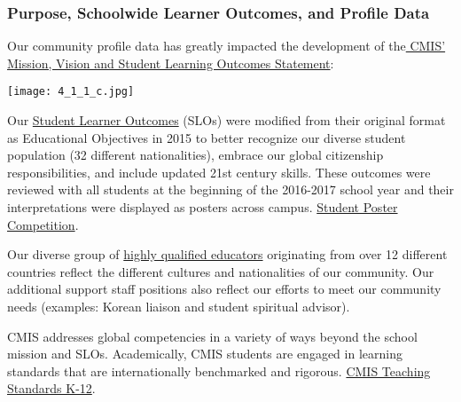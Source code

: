 \subsubsection{Purpose, Schoolwide Learner Outcomes, and Profile Data}



\begin{findings}
Our community profile data has greatly impacted the development of the\href{http://cmis.ac.th/about/vision}{ CMIS’ Mission, Vision and Student Learning Outcomes Statement}:

{\centering\texttt{[image: 4\_1\_1\_c.jpg]}}

Our \href{https://docs.google.com/document/d/1bIbV9pgGz2vpXYJdnRzL_Od5PS35egy7lgBOBuszgD4/edit}{Student Learner Outcomes} (SLOs) were modified from their original format as Educational Objectives in 2015 to better recognize our diverse student population (32 different nationalities), embrace our global citizenship responsibilities, and include updated 21st century skills. These outcomes were reviewed with all students at the beginning of the 2016-2017 school year and their interpretations were displayed as posters across campus. \href{https://docs.google.com/a/cmis.ac.th/presentation/d/1bdi1LZUjWbGKOyB0XR9CGyoY2xLY39SZVKhiHTIJGxc/edit?usp=sharing}{Student Poster Competition}.

Our diverse group of \href{http://www.cmis.ac.th/about/faculty}{highly qualified educators} originating from over 12 different countries reflect the different cultures and nationalities of our community. Our additional support staff positions also reflect our efforts to meet our community needs (examples: Korean liaison and student spiritual advisor).

CMIS addresses global competencies in a variety of ways beyond the school mission and SLOs. Academically, CMIS students are engaged in learning standards that are internationally benchmarked and rigorous. \href{https://drive.google.com/drive/folders/0ByVFfrm0zfolMVRQYmI1aGlRNDQ}{CMIS Teaching Standards K-12}.


\end{findings}
